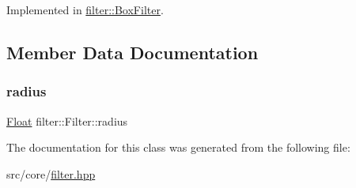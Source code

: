 Implemented in \mbox{\hyperlink{classfilter_1_1BoxFilter_ac7219a821f510523fef5db0b3b5830d7}{filter\+::\+Box\+Filter}}.



\subsection{Member Data Documentation}
\mbox{\label{classfilter_1_1Filter_a9ac4d0dcde52699b63c4b07b030db86b}} 
\subsubsection{\texorpdfstring{radius}{radius}}
{\footnotesize\ttfamily \mbox{\hyperlink{cyclop_8hpp_a07afd7094cb489cbd514c76e6f55d34f}{Float}} filter\+::\+Filter\+::radius}



The documentation for this class was generated from the following file\+:\begin{DoxyCompactItemize}
\item 
src/core/\mbox{\hyperlink{filter_8hpp}{filter.\+hpp}}\end{DoxyCompactItemize}
